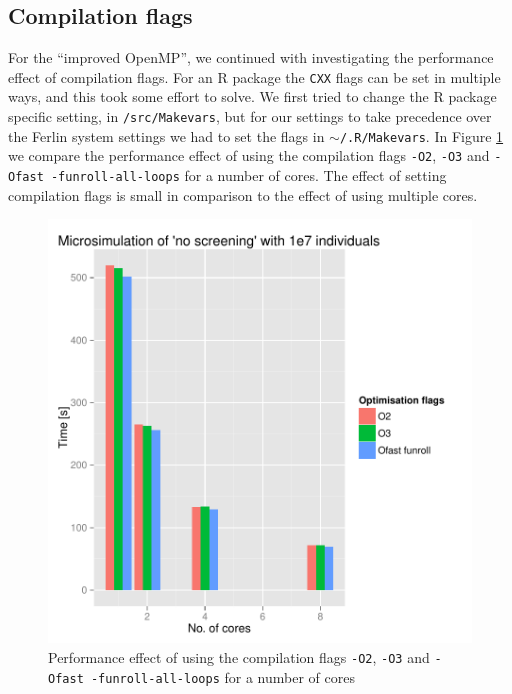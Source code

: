 

\subsection{Compilation flags}

For the ``improved OpenMP'', we continued with investigating the
performance effect of compilation flags. For an R package the
\texttt{CXX} flags can be set in multiple ways, and this took
some effort to solve. We first tried to change the R package
specific setting, in \texttt{/src/Makevars}, but for our settings to
take precedence over the Ferlin system settings we had to set the
flags in \texttt{$\sim$/.R/Makevars}. In Figure \ref{fig:flagScaling} we
compare the performance effect of using the compilation flags
\texttt{-O2}, \texttt{-O3} and \texttt{-Ofast -funroll-all-loops} for
a number of cores. The effect of setting compilation flags is small in
comparison to the effect of using multiple cores.

\begin{figure}[!htbp] \centering
  \includegraphics[height=0.5\textheight]{images/flagsProfiling.pdf}
  \caption{Performance effect of using the compilation flags \texttt{-O2}, \texttt{-O3} and \texttt{-Ofast -funroll-all-loops} for a number of cores}
  \label{fig:flagScaling}
\end{figure}





